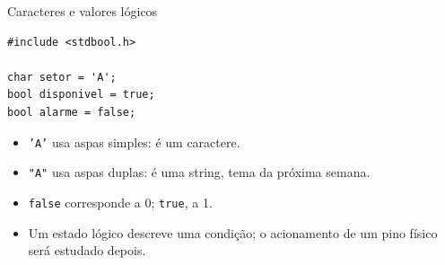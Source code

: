 \begin{frame}[fragile]{Caracteres e valores lógicos}
\begin{lstlisting}
#include <stdbool.h>

char setor = 'A';
bool disponivel = true;
bool alarme = false;
\end{lstlisting}
\begin{itemize}
\item \texttt{'A'} usa aspas simples: é um caractere.
\item \texttt{"A"} usa aspas duplas: é uma string, tema da próxima semana.
\item \texttt{false} corresponde a 0; \texttt{true}, a 1.
\item Um estado lógico descreve uma condição; o acionamento de um pino físico será estudado depois.
\end{itemize}
\end{frame}

